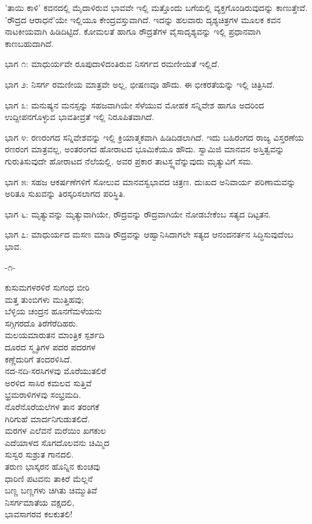 'ತಾಯಿ ಕಾಳಿ' ಕವನದಲ್ಲಿ ಮೈದಾಳಿರುವ ಭಾವವೇ ಇಲ್ಲಿ ಮತ್ತೊಂದು ಬಗೆಯಲ್ಲಿ ವ್ಯಕ್ತಗೊಂಡಿರುವುದನ್ನು ಕಾಣುತ್ತೇವೆ. 'ರೌದ್ರದ ಆರಾಧನೆ'ಯೇ ಇಲ್ಲಿಯೂ ಕೇಂದ್ರವಸ್ತುವಾಗಿದೆ. ಇದನ್ನು ಹಲವಾರು ದೃಶ್ಯಚಿತ್ರಗಳ ಮೂಲಕ ಕವನ ನಾಟಕೀಯವಾಗಿ ಹಿಡಿದಿಟ್ಟಿದೆ. ಕೋಮಲತೆ ಹಾಗೂ ರೌದ್ರತೆಗಳ ವೈಸಾದೃಶ್ಯವನ್ನು ಇಲ್ಲಿ ಪ್ರಧಾನವಾಗಿ ಕಾಣಬಹುದಾಗಿದೆ.

ಭಾಗ ೧: ಮಾಧುರ್ಯವೇ ರೂಪುದಾಳಿದಂತಿರುವ ನಿಸರ್ಗದ ರಮಣೀಯತೆ ಇಲ್ಲಿದೆ.

ಭಾಗ ೨: ನಿಸರ್ಗ ರಮಣೀಯ ಮಾತ್ರವೇ ಅಲ್ಲ, ಭೀಷಣವೂ ಹೌದು. ಈ ಭೀಕರತೆಯನ್ನು ಇಲ್ಲಿ ಚಿತ್ರಿಸಿದೆ.

ಭಾಗ ೩: ಮನುಷ್ಯನ ಮನಸ್ಸನ್ನು ಸಹಜವಾಗಿಯೇ ಸೆಳೆಯುವ ಮೋಹಕ ಸನ್ನಿವೇಶ ಹಾಗೂ ಅದರಿಂದ ಉದ್ದೀಪನಗೊಳ್ಳುವ ಭಾವತೀವ್ರತೆ ಇಲ್ಲಿ ನಿರೂಪಿತವಾಗಿದೆ.

ಭಾಗ ೪: ರಣರಂಗದ ಸನ್ನಿವೇಶವನ್ನು ಇಲ್ಲಿ ಕ್ರಿಯಾತ್ಮಕವಾಗಿ ಹಿಡಿದಿಡಲಾಗಿದೆ. ಇದು ಬಹಿರಂಗದ ರಾಜ್ಯ ವಿಸ್ತರಣೆಯ ರಣರಂಗ ಮಾತ್ರವಲ್ಲ, ಅಂತರಂಗದ ಹೋರಾಟದ ಭೂಮಿಕೆಯೂ ಹೌದು. ಸ್ವಾಮಿಜಿ ಮಾನವನ ಅಸ್ತಿತ್ವವನ್ನು ಗುರುತಿಸುವುದೇ ಹೋರಾಟದ ನೆಲೆಯಲ್ಲಿ. ಅವರ ಪ್ರಕಾರ ತಾಟಸ್ಥ್ಯವೆನ್ನುವುದು ಮೃತ್ಯುವಿಗೆ ಸಮ.

ಭಾಗ ೫: ಸಹಜ ಆಕರ್ಷಣೆಗಳಿಗೆ ಸೋಲುವ ಮಾನವಸ್ವಭಾವದ ಚಿತ್ರಣ. ದುಃಖದ ಅನಿವಾರ್ಯ ಪರಿಣಾಮವನ್ನು ಅರಿತೂ ಸುಖವನ್ನು ತಿರಸ್ಕರಿಸಲಾಗದ ಪರಿಸ್ಥಿತಿ.

ಭಾಗ ೬: ಮೃತ್ಯುವನ್ನು ಮೃತ್ಯುವಾಗಿಯೇ, ರೌದ್ರವನ್ನು ರೌದ್ರವಾಗಿಯೇ ನೋಡಬೇಕೆಂಬ ಸತ್ಯದ ದಿಟ್ಟತನ.

ಭಾಗ ೭: ಮಾಧುರ್ಯದ ಮಸಣ ಮಾಡಿ ರೌದ್ರವನ್ನು ಆಹ್ವಾನಿಸಿದಾಗಲೇ ಸತ್ಯದ ಆನಂದನರ್ತನ ಸಿದ್ಧಿಸುವುದೆಂಬ ಭಾವ.

\begin{center}
-೧-
\end{center}

ಕುಸುಮಗಳರಳಿರೆ ಸುಗಂಧ ಬೀರಿ\\ಮತ್ತ ತುಂಬಿಗಳು ಮುತ್ತಿಹವು;\\ಬೆಳ್ಳಿಯ ಚಂದ್ರನ ಹೂನಗೆಮಳೆಯನು\\ಸಗ್ಗಿಗರದೊ ತಿರೆಗೆರೆದಿಹರು.\\ಮಲಯಮಾರುತನ ಮಾಂತ್ರಿಕ ಸ್ಪರ್ಶದಿ\\ದೂರದ ಸ್ಮೃತಿಗಳ ಪದರ ಪದರಗಳ\\ಕಣ್ಣೆದುರಿಗೆ ತಂದರಳಿಸಿದೆ.\\ನದ-ನದಿ-ಸರಸಿಗಳವು ಮೊರೆಯುತಲಿರೆ\\ಅರಳಿದ ಸಾಸಿರ ಕಮಲವ ಸುತ್ತಿವೆ\\ಭ್ರಮರಾಳಿಗಳವು ಸಂಭ್ರಮದಿ.\\ನೊರೆನೊರೆಯಲೆಗಳ ತಾನ ತರಂಗಕೆ\\ಗಿರಿಗುಹೆ ಮಾರ್ದನಿಗುಡುತಲಿದೆ.\\ಮರಗಳ ಎಲೆವನೆ ಮರೆಯಿಂ ಖಗಕುಲ\\ಎದೆಯಾಳದ ಸೊಗದೊಲವನು ಚಿಮ್ಮಿದ\\ಸುಸ್ವರ ಸುಶ್ರುತ ಗಾನದಲಿ.\\ತರುಣ ಭಾಸ್ಕರನ ಹೊನ್ನಿನ ಕುಂಚವು\\ಧಾರಿಣಿ ಪಟವನು ತಾಕಿರೆ ಮೆಲ್ಲನೆ\\ಬಣ್ಣ ಬಣ್ಣಗಳು ಚಿಗಿತು ಚಿಮ್ಮುತಿವೆ\\ನಿಸರ್ಗಮಾತೆಯ ವಕ್ಷದಲಿ,\\ಭಾವಸಾಗರವ ಕಲಕುತಲಿ!

